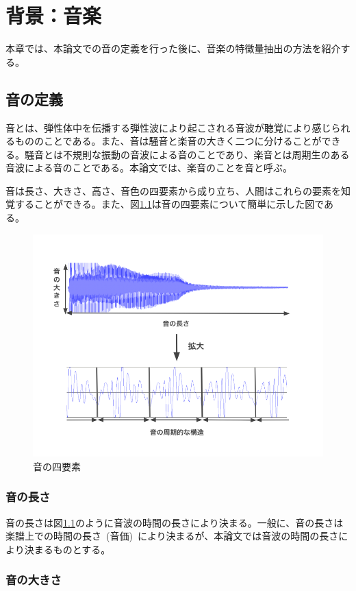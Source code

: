 \chapter{背景：音楽}

本章では、本論文での音の定義を行った後に、音楽の特徴量抽出の方法を紹介する。

\section{音の定義}

音とは、弾性体中を伝播する弾性波により起こされる音波が聴覚により感じられるもののことである。また、音は騒音と楽音の大きく二つに分けることができる。騒音とは不規則な振動の音波による音のことであり、楽音とは周期生のある音波による音のことである。本論文では、楽音のことを音と呼ぶ。

音は長さ、大きさ、高さ、音色の四要素から成り立ち、人間はこれらの要素を知覚することができる。また、図\ref{fig:gakuon}は音の四要素について簡単に示した図である。

\begin{figure}[b]
\begin{center}
\includegraphics[width=0.6\hsize]{figure/gakuon.png}
\caption{音の四要素}
\label{fig:gakuon}
\end{center}
\end{figure}

\subsection{音の長さ}

音の長さは図\ref{fig:gakuon}のように音波の時間の長さにより決まる。一般に、音の長さは楽譜上での時間の長さ~(音価)~により決まるが、本論文では音波の時間の長さにより決まるものとする。

\subsection{音の大きさ}

